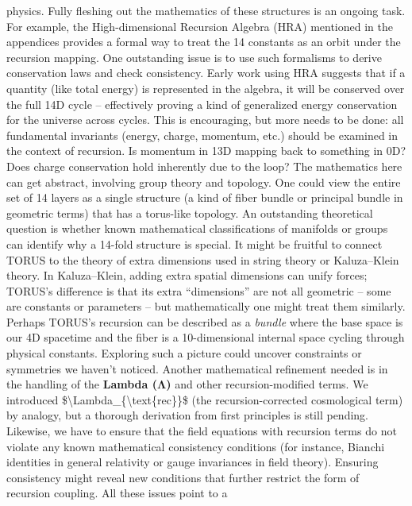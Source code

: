 \begin{itemize}
  physics. Fully fleshing out the mathematics of these structures is an
  ongoing task. For example, the High-dimensional Recursion Algebra
  (HRA) mentioned in the appendices provides a formal way to treat the
  14 constants as an orbit under the recursion mapping​. One outstanding
  issue is to use such formalisms to derive conservation laws and check
  consistency. Early work using HRA suggests that if a quantity (like
  total energy) is represented in the algebra, it will be conserved over
  the full 14D cycle​ -- effectively proving a kind of generalized
  energy conservation for the universe across cycles. This is
  encouraging, but more needs to be done: all fundamental invariants
  (energy, charge, momentum, etc.) should be examined in the context of
  recursion. Is momentum in 13D mapping back to something in 0D? Does
  charge conservation hold inherently due to the loop? The mathematics
  here can get abstract, involving group theory and topology. One could
  view the entire set of 14 layers as a single structure (a kind of
  fiber bundle or principal bundle in geometric terms) that has a
  torus-like topology. An outstanding theoretical question is whether
  known mathematical classifications of manifolds or groups can identify
  why a 14-fold structure is special. It might be fruitful to connect
  TORUS to the theory of extra dimensions used in string theory or
  Kaluza--Klein theory. In Kaluza--Klein, adding extra spatial
  dimensions can unify forces; TORUS's difference is that its extra
  ``dimensions'' are not all geometric -- some are constants or
  parameters -- but mathematically one might treat them similarly.
  Perhaps TORUS's recursion can be described as a \emph{bundle} where
  the base space is our 4D spacetime and the fiber is a 10-dimensional
  internal space cycling through physical constants. Exploring such a
  picture could uncover constraints or symmetries we haven't noticed.
  Another mathematical refinement needed is in the handling of the
  \textbf{Lambda (Λ)} and other recursion-modified terms. We introduced
  \$\textbackslash{}Lambda\_\{\textbackslash{}text\{rec\}\}\$ (the
  recursion-corrected cosmological term) by analogy, but a thorough
  derivation from first principles is still pending. Likewise, we have
  to ensure that the field equations with recursion terms do not violate
  any known mathematical consistency conditions (for instance, Bianchi
  identities in general relativity or gauge invariances in field
  theory). Ensuring consistency might reveal new conditions that further
  restrict the form of recursion coupling. All these issues point to a

\end{itemize}
